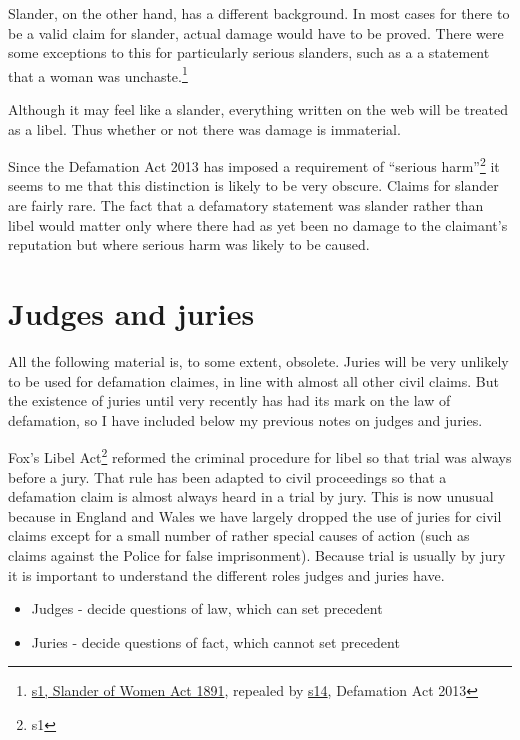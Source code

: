 \documentclass[]{article}
\begin{document}
Slander, on the other hand, has a different background. In most cases
for there to be a valid claim for slander, actual damage would have to
be proved. There were some exceptions to this for particularly serious
slanders, such as a a statement that a woman was unchaste.\footnote{\href{http://www.legislation.gov.uk/ukpga/Vict/54-55/51/section/1}{s1, Slander of Women Act 1891}, repealed by \href{http://www.legislation.gov.uk/ukpga/2013/26/section/14/enacted}{s14}, Defamation Act 2013}

Although it may feel like a slander, everything written on the web will
be treated as a libel. Thus whether or not there was damage is
immaterial.

Since the Defamation Act 2013 has imposed a requirement of ``serious harm''\footnote{s1} it seems to me that this distinction is likely to be very obscure. Claims for slander are fairly rare. The fact that a defamatory statement was slander rather than libel would matter only where there had as yet been no damage to the claimant's reputation but where serious harm was likely to be caused.


\section{Judges and juries}

All the following material is, to some extent, obsolete. Juries will be very unlikely to be used for defamation claimes, in line with almost all other civil claims. But the existence of juries until very recently has had its mark on the law of defamation, so I have included below my previous notes on judges and juries.

{Fox's Libel Act\hyperref[sdfootnote2sym]{\textsuperscript{2}} reformed
the criminal procedure for libel so that trial was always before a jury.
That rule has been adapted to civil proceedings so that a defamation
claim is almost always heard in a trial by jury. This is now unusual
because in England and Wales we have largely dropped the use of juries
for civil claims except for a small number of rather special causes of
action (such as claims against the Police for false imprisonment).
Because trial is usually by jury it is important to understand the
different roles judges and juries have.}

\begin{itemize}
\item
  Judges - decide questions of law, which can set precedent
\item
  Juries - decide questions of fact, which cannot set precedent
\end{itemize}
\end{document}
